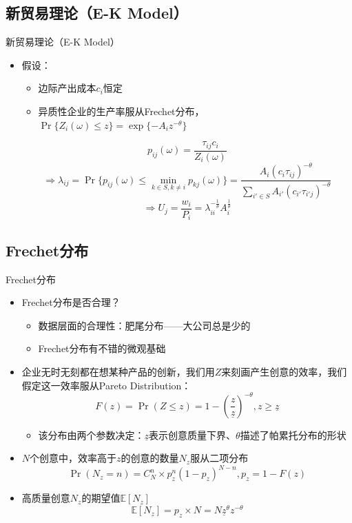 \documentclass{beamer}
\begin{document}
\subsection{新贸易理论（E-K Model）}
\begin{frame}{新贸易理论（E-K Model）}
\begin{itemize}
    \item 假设：
    \begin{itemize}
        \item 边际产出成本\(c_i\)恒定
        \item 异质性企业的生产率服从Frechet分布，\(\Pr\{Z_{i}(\omega)\leq z\}=\exp\{-A_{i}z^{-\theta}\}\)
    \end{itemize}
\[p_{ij}(\omega)=\frac{\tau_{ij}c_i}{Z_i(\omega)}\]
\[\Longrightarrow\lambda_{ij}=\Pr\{p_{ij}(\omega)\leq\min_{k\in S,k\neq i}p_{kj}(\omega)\}=\frac{A_{i}\left(c_{i}\tau_{ij}\right)^{-\theta}}{\sum_{i'\in S}A_{i'}\left(c_{i'}\tau_{i'j}\right)^{-\theta}}\]
\[\Longrightarrow U_j=\frac{w_{i}}{P_{i}}=\lambda_{ii}^{-\frac{1}{\theta}}A_{i}^{\frac{1}{\theta}}\]
\end{itemize}
\end{frame}

\subsection{Frechet分布}
\begin{frame}{Frechet分布}
\begin{itemize}
    \item Frechet分布是否合理？
    \begin{itemize}
        \item 数据层面的合理性：肥尾分布——大公司总是少的
        \item Frechet分布有不错的微观基础
    \end{itemize}
\end{itemize}
\begin{itemize}
    \item 企业无时无刻都在想某种产品的创新，我们用\(Z\)来刻画产生创意的效率，我们假定这一效率服从Pareto Distribution：
\[F(z)=\Pr(Z\leq z)=1-\left(\frac{z}{\underline{z}}\right)^{-\theta},z\geq\underline{z}\]
\begin{itemize}
    \item 该分布由两个参数决定：\(\underline{z}\)表示创意质量下界、\(\theta\)描述了帕累托分布的形状
\end{itemize}
    \item \(N\)个创意中，效率高于\(z\)的创意的数量\(N_z\)服从二项分布
\[\Pr(N_{z}=n)=C_{N}^{n}\times p_{z}^{n}\left(1-p_{z}\right)^{N-n},p_z=1-F(z)\]
    \item 高质量创意\(N_z\)的期望值\(\mathbb{E}\left[N_z\right]\)
\[\mathbb{E}\left[N_z\right]=p_z\times N=N\underline{z}^{\theta}z^{-\theta}\]
\end{itemize}
\end{frame}
\end{document}
